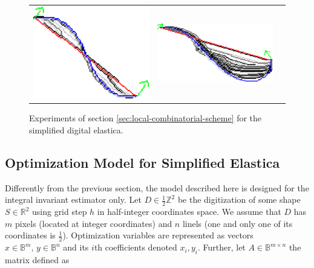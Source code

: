 \begin{figure}[]
\begin{tabular}{ccc}
\includegraphics[scale=0.25]{figures/chapter5/fixed-orientations/selastica/len_pen_0.01/curve-2/summary.pdf} &
\includegraphics[scale=0.25]{figures/chapter5/fixed-orientations/selastica/len_pen_0.01/curve-3/summary.pdf}
\end{tabular}
\caption{Experiments of section \ref{sec:local-combinatorial-scheme} for the simplified digital elastica.}
\label{fig:simplified-elastica}
\end{figure}


\subsection{Optimization Model for Simplified Elastica}

Differently from the previous section, the model described here is designed for the integral invariant estimator only. Let $D \in \frac{1}{2}\mathbb{Z}^2$ be the digitization of some shape $S \in \mathbb{R}^2$ using grid step $h$ in half-integer coordinates space. We assume that $D$ has $m$ pixels (located at integer coordinates) and $n$ linels (one and only one of its coordinates is $\frac{1}{2}$). Optimization variables are represented as vectors $x \in \mathbb{B}^{m},\, y \in \mathbb{B}^{n}$ and its $i$th coefficients denoted  $x_i,y_i$.  Further, let $A \in \mathbb{B}^{m\times n}$ the matrix defined as


